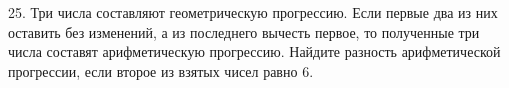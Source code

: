 25. Три числа составляют геометрическую прогрессию. Если первые два из них оставить без изменений, а из последнего вычесть первое, то полученные три числа составят арифметическую прогрессию. Найдите разность арифметической прогрессии, если второе из взятых чисел равно 6.\\
